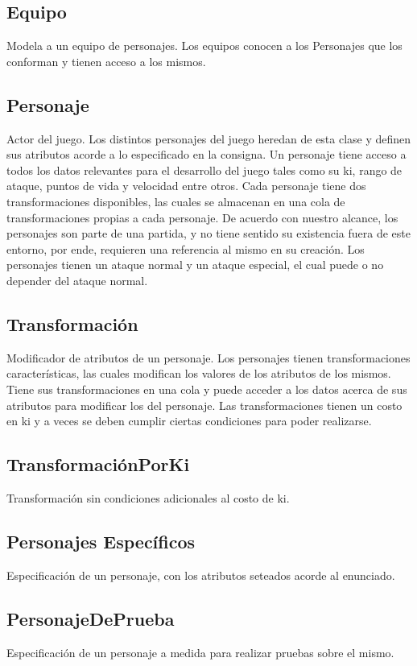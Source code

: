\documentclass[a4paper]{article}
\begin{document}
\subsection{Equipo}
Modela a un equipo de personajes. Los equipos conocen a los Personajes que los  conforman y tienen acceso a los mismos.

\subsection{Personaje}
 Actor del juego. Los distintos personajes del juego heredan de esta clase y definen sus atributos acorde a lo especificado en la consigna. Un personaje tiene acceso a todos los datos relevantes para el desarrollo del juego tales como su ki, rango de ataque, puntos de vida y velocidad entre otros. Cada personaje tiene dos transformaciones disponibles, las cuales se almacenan en una cola de transformaciones propias a cada personaje. De acuerdo con nuestro alcance, los personajes son parte de una partida, y no tiene sentido su existencia fuera de este entorno, por ende, requieren una referencia al mismo en su creación. Los personajes tienen un ataque normal y un ataque especial, el cual puede o no depender del ataque normal. 

\subsection{Transformación}
Modificador de atributos de un personaje. Los personajes tienen transformaciones características, las cuales modifican los valores de los atributos de los mismos. Tiene sus transformaciones en una cola y puede acceder a los datos acerca de sus atributos para modificar los del personaje. Las transformaciones tienen un costo en ki y a veces se deben cumplir ciertas condiciones para poder realizarse.

\subsection{TransformaciónPorKi}
Transformación sin condiciones adicionales al costo de ki.


\subsection{Personajes Específicos}
Especificación de un personaje, con los atributos seteados acorde al enunciado.

\subsection{PersonajeDePrueba}
Especificación de un personaje a medida para realizar pruebas sobre el mismo.
\end{document}

